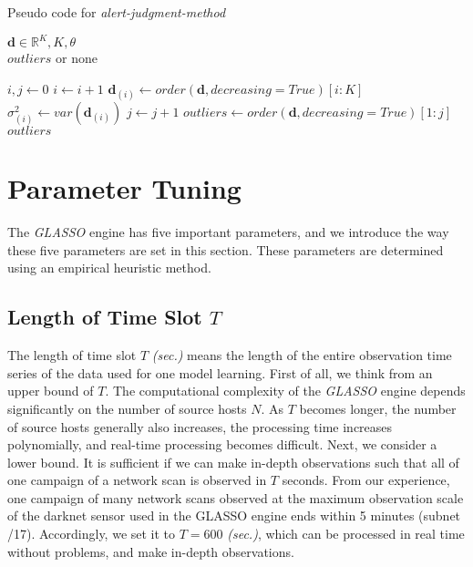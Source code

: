 \documentclass[conference]{IEEEtran}
\begin{document}
\begin{algorithm}[tb]
\caption{Pseudo code for {\it alert-judgment-method}}
\label{alg2}
\begin{algorithmic}[1]
  \REQUIRE $\bm{d}\in\mathbb{R}^{K}, K, \theta$\\
  \ENSURE $outliers$ or none

  \STATE $i, j \gets 0$
    \STATE $i \gets i + 1$
    \STATE $\bm{d}_{(i)} \gets order(\bm{d}, decreasing=True)[i:K]$
    \STATE $\sigma_{(i)}^2 \gets var(\bm{d}_{(i)})$
      \STATE $j \gets j + 1$
    \ELSE
      \STATE $outliers \gets order(\bm{d}, decreasing=True)[1:j]$
      \RETURN $outliers$
    \ENDIF
  \ENDWHILE
\end{algorithmic}
\end{algorithm}


\section{Parameter Tuning}
The {\it GLASSO} engine has five important parameters, and we introduce the way these five parameters are set in this section.
These parameters are determined using an empirical heuristic method.


\subsection{Length of Time Slot $T$}
The length of time slot $T$ {\it (sec.)} means the length of the entire observation time series of the data used for one model learning.
First of all, we think from an upper bound of $T$.
The computational complexity of the {\it GLASSO} engine depends significantly on the number of source hosts $N$.
As $T$ becomes longer, the number of source hosts generally also increases, the processing time increases polynomially, and real-time processing becomes difficult.
Next, we consider a lower bound.
It is sufficient if we can make in-depth observations such that all of one campaign of a network scan is observed in $T$ seconds.
From our experience, one campaign of many network scans observed at the maximum observation scale of the darknet sensor used in the GLASSO engine ends within 5 minutes (subnet /17).
Accordingly, we set it to $T=600$ {\it (sec.)}, which can be processed in real time without problems, and make in-depth observations.
\end{document}
